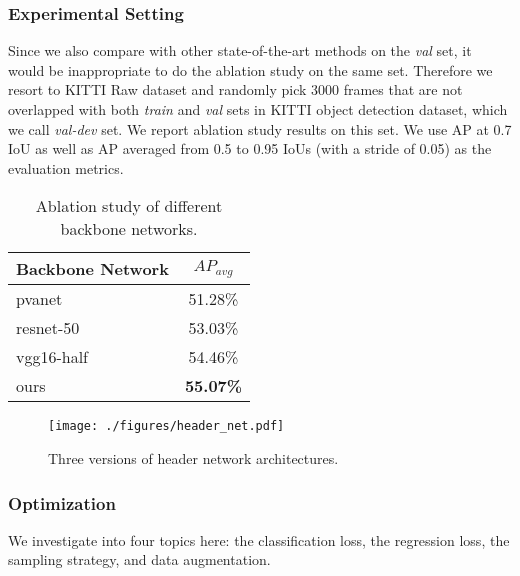\vspace{-0.2cm}
\subsubsection{Experimental Setting}

Since we also compare with other state-of-the-art methods on the {\it val} set, it would be inappropriate to do the ablation study on the same set. Therefore we resort to KITTI Raw dataset \cite{kitti-raw} and randomly pick 3000 frames that are not overlapped with both {\it train} and {\it val} sets in KITTI object detection dataset, which we call {\it val-dev} set. We report ablation study results on this set. We use AP at 0.7 IoU as well as AP averaged from 0.5 to 0.95 IoUs (with a stride of 0.05) as the evaluation metrics.

\begin{table}[t]
\begin{center}
\begin{small}
\begin{tabular}{|l|c|}
\hline
Backbone Network & $AP_{avg}$ \\
\hline
pvanet & 51.28\% \\
resnet-50 & 53.03\% \\
vgg16-half & 54.46\% \\
ours & {\bf 55.07\%} \\
\hline
\end{tabular}
\caption{Ablation study of different backbone networks.}
\label{tab:backbone_exp}
\end{small}
\end{center}
\vspace{-0.5cm}
\end{table}
\begin{figure}[t]
\begin{center}
   \texttt{[image: ./figures/header\_net.pdf]}
\caption{Three versions of header network architectures.}
\label{fig:subnet}
\end{center}
\vspace{-0.5cm}
\end{figure}


\vspace{-0.2cm}
\subsubsection{Optimization}

We investigate into four topics here: the classification loss, the regression loss, the sampling strategy, and data augmentation.

